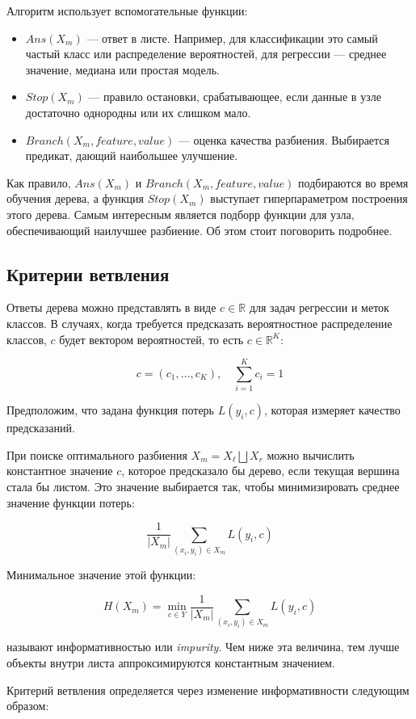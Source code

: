 Алгоритм использует вспомогательные функции:
\begin{itemize}
    \item $Ans(X_m)$ — ответ в листе. Например, для классификации это самый частый класс или распределение вероятностей, для регрессии — среднее значение, медиана или простая модель.
    \item $Stop(X_m)$ — правило остановки, срабатывающее, если данные в узле достаточно однородны или их слишком мало.
    \item $Branch(X_m, \textit{feature}, \textit{value})$ — оценка качества разбиения. Выбирается предикат, дающий наибольшее улучшение.
\end{itemize}

Как правило, $Ans(X_m)$ и $Branch(X_m, \textit{feature}, \textit{value})$ подбираются во время обучения дерева, а функция $Stop(X_m)$ выступает гиперпараметром построения этого дерева.
Самым интересным является подборр функции для узла, обеспечивающий наилучшее разбиение. Об этом стоит поговорить подробнее.

\subsection{Критерии ветвления}
Ответы дерева можно представлять в виде $c \in \mathbb{R}$ для задач регрессии и меток классов. В случаях, когда требуется предсказать вероятностное распределение классов, $c$ будет вектором вероятностей, то есть $c \in \mathbb{R}^K$:

\[
    c = (c_1, \dots, c_K), \quad \sum_{i=1}^K c_i = 1
\]

Предположим, что задана функция потерь $L(y_i, c)$, которая измеряет качество предсказаний.

При поиске оптимального разбиения $X_m = X_\ell \bigsqcup X_r$ можно вычислить константное значение $c$, которое предсказало бы дерево, если текущая вершина стала бы листом. Это значение выбирается так, чтобы минимизировать среднее значение функции потерь:

\[
    \frac{1}{|X_m|} \sum_{(x_i, y_i) \in X_m} L(y_i, c)
\]

Минимальное значение этой функции:

\[
    H(X_m) = \min_{c \in Y} \frac{1}{|X_m|} \sum_{(x_i, y_i) \in X_m} L(y_i, c)
\]

называют информативностью или \textit{impurity}. Чем ниже эта величина, тем лучше объекты внутри листа аппроксимируются константным значением.

Критерий ветвления определяется через изменение информативности следующим образом:

